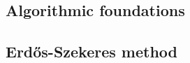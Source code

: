 \begin{lemma}
  \label{lem:taylor-nonneg}
\end{lemma}

\subsection{Algorithmic foundations}


\begin{definition}
  \label{def:algorithm-state}
\end{definition}



\subsection{Erdős-Szekeres method}


